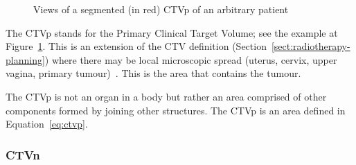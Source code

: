 \documentclass[12pt,twoside]{report}
\begin{document}
\begin{figure}[H]
  \centering
  \caption{Views of a segmented (in red) CTVp of an arbitrary patient}
 \label{fig:example-CTVp}
\end{figure}

The CTVp stands for the Primary Clinical Target Volume; see the example at Figure~\ref{fig:example-CTVp}. This is an extension of the CTV definition (Section~\ref{sect:radiotherapy-planning}) where there may be local microscopic spread (uterus, cervix, upper vagina, primary tumour)~\cite{AMLART-data}. This is the area that contains the tumour. 

The CTVp is not an organ in a body but rather an area comprised of other components formed by joining other structures. The CTVp is an area defined in Equation~\ref{eq:ctvp}.

\subsubsection{CTVn}\label{sec:data-CTVn}
\end{document}
